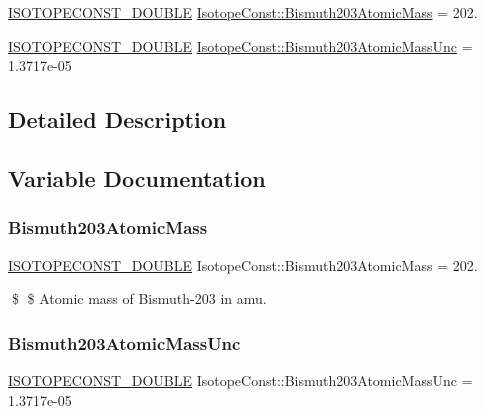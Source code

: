 \begin{DoxyCompactItemize}
\item 
\mbox{\hyperlink{group___isotope_const-_macros_ga8f45a7272ce02c0b4c65c44636ed719a}{I\+S\+O\+T\+O\+P\+E\+C\+O\+N\+S\+T\+\_\+\+D\+O\+U\+B\+LE}} \mbox{\hyperlink{group___isotope_const-_bismuth-_bi203_ga5df0c9f7c45e830e753cab65b5fe86c3}{Isotope\+Const\+::\+Bismuth203\+Atomic\+Mass}} = 202.
\item 
\mbox{\hyperlink{group___isotope_const-_macros_ga8f45a7272ce02c0b4c65c44636ed719a}{I\+S\+O\+T\+O\+P\+E\+C\+O\+N\+S\+T\+\_\+\+D\+O\+U\+B\+LE}} \mbox{\hyperlink{group___isotope_const-_bismuth-_bi203_ga98cbcf42a4d15bffec5167d3847fc03b}{Isotope\+Const\+::\+Bismuth203\+Atomic\+Mass\+Unc}} = 1.\+3717e-\/05
\end{DoxyCompactItemize}


\subsection{Detailed Description}


\subsection{Variable Documentation}
\mbox{\label{group___isotope_const-_bismuth-_bi203_ga5df0c9f7c45e830e753cab65b5fe86c3}} 
\subsubsection{\texorpdfstring{Bismuth203\+Atomic\+Mass}{Bismuth203AtomicMass}}
{\footnotesize\ttfamily \mbox{\hyperlink{group___isotope_const-_macros_ga8f45a7272ce02c0b4c65c44636ed719a}{I\+S\+O\+T\+O\+P\+E\+C\+O\+N\+S\+T\+\_\+\+D\+O\+U\+B\+LE}} Isotope\+Const\+::\+Bismuth203\+Atomic\+Mass = 202.}

\$ \$ Atomic mass of Bismuth-\/203 in amu. \mbox{\label{group___isotope_const-_bismuth-_bi203_ga98cbcf42a4d15bffec5167d3847fc03b}} 
\subsubsection{\texorpdfstring{Bismuth203\+Atomic\+Mass\+Unc}{Bismuth203AtomicMassUnc}}
{\footnotesize\ttfamily \mbox{\hyperlink{group___isotope_const-_macros_ga8f45a7272ce02c0b4c65c44636ed719a}{I\+S\+O\+T\+O\+P\+E\+C\+O\+N\+S\+T\+\_\+\+D\+O\+U\+B\+LE}} Isotope\+Const\+::\+Bismuth203\+Atomic\+Mass\+Unc = 1.\+3717e-\/05}

